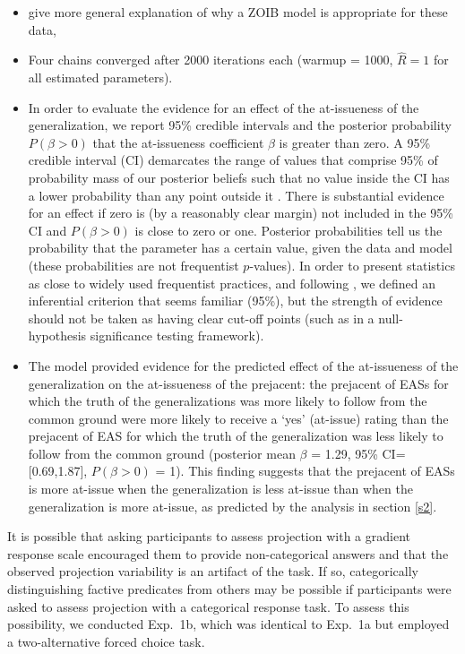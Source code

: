 \documentclass[11pt,fleqn]{article}
\newcommand{\6}{\mbox{$[\hspace*{-.6mm}[$}}
\newcommand{\9}{\mbox{$]\hspace*{-.6mm}]$}}
\begin{document}
\begin{itemize}

\item give more general explanation of why a ZOIB model is appropriate for these data, 

\item Four chains converged after 2000 iterations each (warmup = 1000, \(\hat{R}=1\) for all estimated parameters).

\item In order to evaluate the evidence for an effect of the at-issueness of the generalization, we report 95\% credible intervals and the posterior probability $P(\beta > 0)$ that the at-issueness coefficient $\beta$ is greater than zero. A 95\% credible interval (CI) demarcates the range of values that comprise 95\% of probability mass of our posterior beliefs such that no value inside the CI has a lower probability than any point outside it \citep{Jaynes1976, Morey2016}. There is substantial evidence for an effect if zero is (by a reasonably clear margin) not included in the 95\% CI and $P(\beta > 0)$ is close to zero or one. Posterior probabilities tell us the probability that the parameter has a certain value, given the data and model (these probabilities are not frequentist $p$-values). In order to present statistics as close to widely used frequentist practices, and following \citealt{Nicenboim2016}, we defined an inferential criterion that seems familiar (95\%), but the strength of evidence should not be taken as having clear cut-off points (such as in a null-hypothesis significance testing framework).

\item The model provided evidence for the predicted effect of the at-issueness of the generalization on the at-issueness of the prejacent: the prejacent of EASs for which the truth of the generalizations was more likely to follow from the common ground were more likely to receive a `yes' (at-issue) rating than the prejacent of EAS for which the truth of the generalization was less likely to follow from the common ground  (posterior mean $\beta$ = 1.29, 95\% CI={[}0.69,1.87{]}, $P(\beta > 0)$ = 1). This finding suggests that the prejacent of EASs is more at-issue when the generalization is less at-issue than when the generalization is more at-issue, as predicted by the analysis in section \ref{s2}.

\end{itemize}

It is possible that asking participants to assess projection with a gradient response scale encouraged them to provide non-categorical answers and that the observed projection variability is an artifact of the task. If so, categorically distinguishing factive predicates from others may be possible if participants were asked to assess projection with a categorical response task. To assess this possibility, we conducted Exp.~1b, which was identical to Exp.~1a but employed a two-alternative forced choice task.
\end{document}
